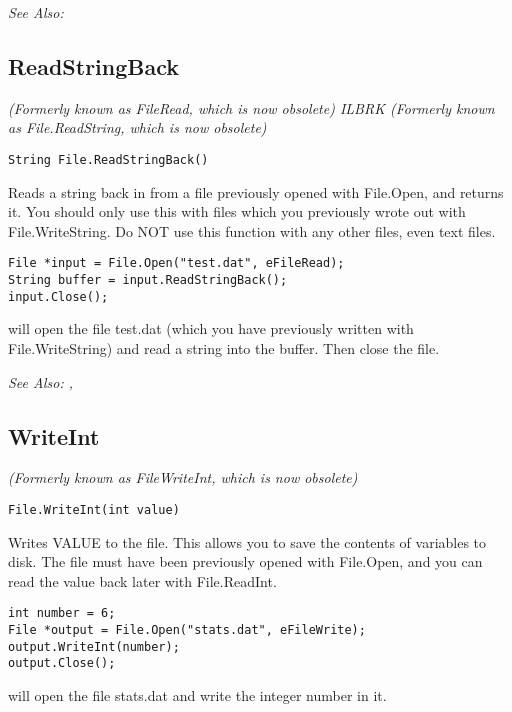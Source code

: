 \it{See Also:} 


\subsection{ReadStringBack}\label{File.ReadStringBack}%

\it{(Formerly known as FileRead, which is now obsolete)} ILBRK
\it{(Formerly known as File.ReadString, which is now obsolete)}

\begin{verbatim}
String File.ReadStringBack()
\end{verbatim}
Reads a string back in from a file previously opened with File.Open, and returns it.
You should only use this with files which you previously wrote out with
File.WriteString. Do NOT use this function with any other files, even text files.

\begin{verbatim}
File *input = File.Open("test.dat", eFileRead);
String buffer = input.ReadStringBack();
input.Close();
\end{verbatim}
will open the file test.dat (which you have previously written with File.WriteString) and
read a string into the buffer. Then close the file.

\it{See Also:} , 


\subsection{WriteInt}\label{File.WriteInt}%

\it{(Formerly known as FileWriteInt, which is now obsolete)}

\begin{verbatim}
File.WriteInt(int value)
\end{verbatim}
Writes VALUE to the file. This allows you to save the contents of
variables to disk. The file must have been previously opened with File.Open,
and you can read the value back later with File.ReadInt.

\begin{verbatim}
int number = 6;
File *output = File.Open("stats.dat", eFileWrite);
output.WriteInt(number);
output.Close();
\end{verbatim}
will open the file stats.dat and write the integer number in it.

